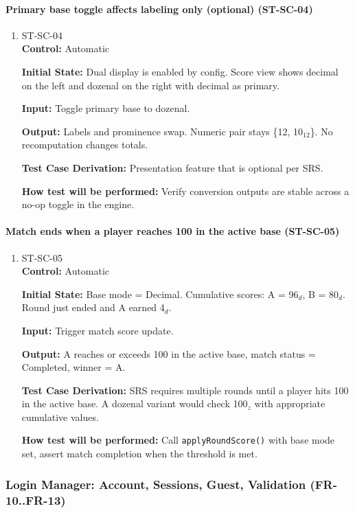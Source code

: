 \documentclass[12pt, titlepage]{article}
\begin{document}
\paragraph{Primary base toggle affects labeling only (optional) (ST-SC-04)}
\begin{enumerate}
\item{ST-SC-04\\}
\textbf{Control:} Automatic

\textbf{Initial State:} Dual display is enabled by config. Score view shows decimal on the left and dozenal on the right with decimal as primary.

\textbf{Input:} Toggle primary base to dozenal.

\textbf{Output:} Labels and prominence swap. Numeric pair stays \{12, 10$_{12}$\}. No recomputation changes totals.

\textbf{Test Case Derivation:} Presentation feature that is optional per SRS.

\textbf{How test will be performed:} Verify conversion outputs are stable across a no-op toggle in the engine.
\end{enumerate}

\paragraph{Match ends when a player reaches 100 in the active base (ST-SC-05)}
\begin{enumerate}
\item{ST-SC-05\\}
\textbf{Control:} Automatic

\textbf{Initial State:} Base mode = Decimal. Cumulative scores: A = 96$_{d}$, B = 80$_{d}$. Round just ended and A earned 4$_{d}$.

\textbf{Input:} Trigger match score update.

\textbf{Output:} A reaches or exceeds 100 in the active base, match status = Completed, winner = A.

\textbf{Test Case Derivation:} SRS requires multiple rounds until a player hits 100 in the active base. A dozenal variant would check 100$_{z}$ with appropriate cumulative values.

\textbf{How test will be performed:} Call \texttt{applyRoundScore()} with base mode set, assert match completion when the threshold is met.
\end{enumerate}

\subsubsection{Login Manager: Account, Sessions, Guest, Validation (FR-10..FR-13)}
\end{document}
